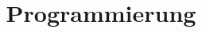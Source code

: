 
\newcommand{\frontframe}{%
    \titlepage%
    \begin{center}\extratitlepageline\end{center}%
}
\author{\authorname\\~\authormail}

\title{Programmierung}
\date{}

\newcommand{\keybd}[1]{\menu{#1}}

\newenvironment{tryit}{\par\ttfamily\small}{\sffamily\par}
